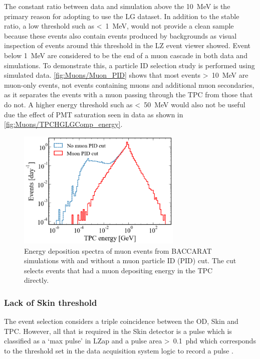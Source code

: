 The constant ratio between data and simulation above the 10~MeV is the primary reason for adopting to use the LG dataset. In addition to the stable ratio, a low threshold such as \textless~1~MeV, would not provide a clean sample because these events also contain events produced by backgrounds as visual inspection of events around this threshold in the LZ event viewer showed. Event below 1~MeV are considered to be the end of a muon cascade in both data and simulations. To demonstrate this, a particle ID selection study is performed using simulated data. \autoref{fig:Muons/Muon_PID} shows that most events \textgreater~10~MeV are muon-only events, not events containing muons and additional muon secondaries, as it separates the events with a muon passing through the TPC from those that do not. A higher energy threshold such as \textless~50~MeV would also not be useful due the effect of PMT saturation seen in data as shown in \autoref{fig:Muons/TPCHGLGComp_energy}.
\begin{figure}[h!]
    \centering
    \includegraphics[width=0.7\textwidth]{figures/Muons/Muon_pid_cutLZstyle.pdf}
    \caption[Energy deposition spectra of muon events from BACCARAT simulations with and without a muon particle ID (PID) cut.]{Energy deposition spectra of muon events from BACCARAT simulations with and without a muon particle ID (PID) cut. The cut selects events that had a muon depositing energy in the TPC directly.}
    \label{fig:Muons/Muon_PID}
\end{figure}

\subsubsection{Lack of Skin threshold}\label{sec:Muons/MuonFluxSkinThreshold}
The event selection considers a triple coincidence between the OD, Skin and TPC. However, all that is required in the Skin detector is a pulse which is classified as a `max pulse' in LZap and a pulse area \textgreater~0.1~phd which corresponds to the threshold set in the data acquisition system logic to record a pulse \cite{LZ:2024bvw}.


